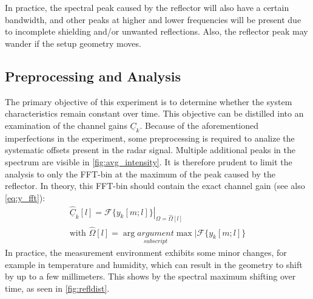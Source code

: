 In practice, the spectral peak caused by the reflector will also have a certain bandwidth,
and other peaks at higher and lower frequencies will be present due to incomplete shielding and/or unwanted reflections.
Also, the reflector peak may wander if the setup geometry moves.

\subsection{Preprocessing and Analysis}
The primary objective of this experiment is to determine whether the system characteristics remain constant over time. 
This objective can be distilled into an examination of the channel gains $\underline C_k$.
Because of the aforementioned imperfections in the experiment, some preprocessing is required to analize the systematic offsets present in the radar signal.
Multiple additional peaks in the spectrum are visible in \autoref{fig:avg_intensity}.
It is therefore prudent to limit the analysis to only the FFT-bin at the maximum of the peak caused by the reflector.
In theory, this FFT-bin should contain the exact channel gain (see also \autoref{eq:y_fft}):
\begin{align}
    \hat{\underline{C}}_k[l] = \left.\mathcal{F}\{ y_k[m;l]\}\right|_{\Omega=\hat \Omega[l]} \\
    \text{with } \hat\Omega[l] = \arg \underset{subscript}{argument}\max |\mathcal{F}\{ y_k[m;l]\}
\end{align}
In practice, the measurement environment exhibits some minor changes, for example in temperature and humidity, 
which can result in the geometry to shift by up to a few millimeters.
This shows by the spectral maximum shifting over time, as seen in \autoref{fig:refldist}.
